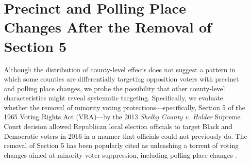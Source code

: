 \documentclass[12pt]{article}
\begin{document}


\section{\large Precinct and Polling Place Changes After the Removal of Section 5}\label{sub_shelby}
\vspace*{-0.5cm}

Although the distribution of county-level effects does not suggest a pattern in which some counties are differentially targeting opposition voters with precinct and polling place changes, we probe the possibility that other county-level characteristics might reveal systematic targeting.  Specifically, we evaluate whether the removal of minority voting protections---specifically, Section 5 of the 1965 Voting Rights Act (VRA)---by the 2013 \emph{Shelby County v. Holder} Supreme Court decision allowed Republican local election officials to target Black and Democratic voters in 2016 in a manner that officials could not previously do.  The removal of Section 5 has been popularly cited as unleashing a torrent of voting changes aimed at minority voter suppression, including polling place changes \citep{knafo2013,berman2016,Graham:2016wq,BrennanCenterforJustice:2018ux}.
\end{document}
